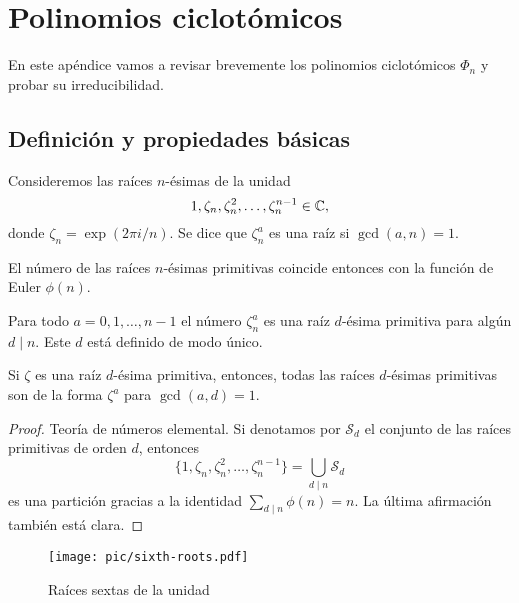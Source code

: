\chapter{Polinomios ciclotómicos}
\label{ap:polinomios-ciclotomicos}

En este apéndice vamos a revisar brevemente los polinomios ciclotómicos $\Phi_n$
y probar su irreducibilidad.

\section{Definición y propiedades básicas}

\begin{definicion}
  Consideremos las raíces $n$-ésimas de la unidad
  $$1, \zeta_n, \zeta_n^2, \ldots, \zeta_n^{n-1} \in \mathbb{C},$$
  donde $\zeta_n = \exp (2\pi i/n)$. Se dice que $\zeta_n^a$ es una raíz
   si $\gcd (a,n) = 1$.
\end{definicion}

El número de las raíces $n$-ésimas primitivas coincide entonces con la función
de Euler $\phi (n)$.

\begin{lema}
  \label{lema:descomposicion-en-raices-primitivas}
  Para todo $a = 0,1,\ldots,n-1$ el número $\zeta_n^a$ es una raíz $d$-ésima
  primitiva para algún $d \mid n$. Este $d$ está definido de modo único.

  Si $\zeta$ es una raíz $d$-ésima primitiva, entonces, todas las raíces
  $d$-ésimas primitivas son de la forma $\zeta^a$ para $\gcd (a,d) = 1$.

  \begin{proof}
    Teoría de números elemental. Si denotamos por $\mathcal{S}_d$ el conjunto de
    las raíces primitivas de orden $d$, entonces
    \[ \{ 1, \zeta_n, \zeta_n^2, \ldots, \zeta_n^{n-1} \} =
        \bigcup_{d\mid n} \mathcal{S}_d \]
    es una partición gracias a la identidad $\sum_{d\mid n} \phi (n) = n$.
    La última afirmación también está clara.
  \end{proof}
\end{lema}

\begin{figure}
  \begin{center}
    \texttt{[image: pic/sixth-roots.pdf]}
  \end{center}

  \caption{Raíces sextas de la unidad}
\end{figure}

